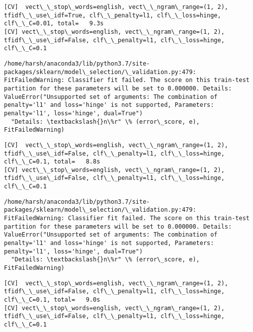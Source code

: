\documentclass[11pt]{article}
\begin{document}
    \begin{Verbatim}[commandchars=\\\{\}]
[CV]  vect\_\_stop\_words=english, vect\_\_ngram\_range=(1, 2), tfidf\_\_use\_idf=True, clf\_\_penalty=l1, clf\_\_loss=hinge, clf\_\_C=0.01, total=   9.3s
[CV] vect\_\_stop\_words=english, vect\_\_ngram\_range=(1, 2), tfidf\_\_use\_idf=False, clf\_\_penalty=l1, clf\_\_loss=hinge, clf\_\_C=0.1 

    \end{Verbatim}

    \begin{Verbatim}[commandchars=\\\{\}]
/home/harsh/anaconda3/lib/python3.7/site-packages/sklearn/model\_selection/\_validation.py:479: FitFailedWarning: Classifier fit failed. The score on this train-test partition for these parameters will be set to 0.000000. Details: 
ValueError("Unsupported set of arguments: The combination of penalty='l1' and loss='hinge' is not supported, Parameters: penalty='l1', loss='hinge', dual=True")
  "Details: \textbackslash{}n\%r" \% (error\_score, e), FitFailedWarning)

    \end{Verbatim}

    \begin{Verbatim}[commandchars=\\\{\}]
[CV]  vect\_\_stop\_words=english, vect\_\_ngram\_range=(1, 2), tfidf\_\_use\_idf=False, clf\_\_penalty=l1, clf\_\_loss=hinge, clf\_\_C=0.1, total=   8.8s
[CV] vect\_\_stop\_words=english, vect\_\_ngram\_range=(1, 2), tfidf\_\_use\_idf=False, clf\_\_penalty=l1, clf\_\_loss=hinge, clf\_\_C=0.1 

    \end{Verbatim}

    \begin{Verbatim}[commandchars=\\\{\}]
/home/harsh/anaconda3/lib/python3.7/site-packages/sklearn/model\_selection/\_validation.py:479: FitFailedWarning: Classifier fit failed. The score on this train-test partition for these parameters will be set to 0.000000. Details: 
ValueError("Unsupported set of arguments: The combination of penalty='l1' and loss='hinge' is not supported, Parameters: penalty='l1', loss='hinge', dual=True")
  "Details: \textbackslash{}n\%r" \% (error\_score, e), FitFailedWarning)

    \end{Verbatim}

    \begin{Verbatim}[commandchars=\\\{\}]
[CV]  vect\_\_stop\_words=english, vect\_\_ngram\_range=(1, 2), tfidf\_\_use\_idf=False, clf\_\_penalty=l1, clf\_\_loss=hinge, clf\_\_C=0.1, total=   9.0s
[CV] vect\_\_stop\_words=english, vect\_\_ngram\_range=(1, 2), tfidf\_\_use\_idf=False, clf\_\_penalty=l1, clf\_\_loss=hinge, clf\_\_C=0.1 

    \end{Verbatim}
\end{document}
